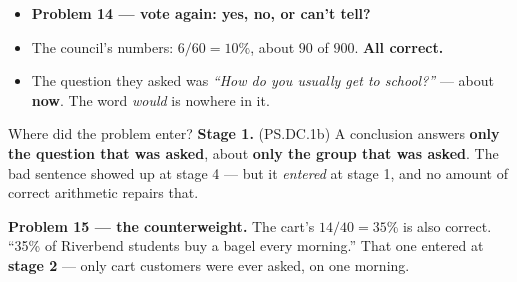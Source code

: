 \documentclass[aspectratio=169, 11pt]{beamer}
\newcommand{\redink}[1]{{\color{redacc}\bfseries #1}}
\begin{document}
\begin{frame}[t, plain]
  \vspace{4pt}
  \begin{itemize}\setlength{\itemsep}{4pt}
    \item \textbf{Problem 14 --- vote again: yes, no, or can't tell?}
    \item The council's numbers: $6/60 = 10\%$, about $90$ of $900$. \redink{All correct.}
    \item The question they asked was \emph{``How do you usually get to school?''} ---
          about \redink{now}. The word \emph{would} is nowhere in it.
  \end{itemize}
  \vspace{6pt}
  \begin{block}{Where did the problem enter? \redink{Stage 1.} (PS.DC.1b)}
    A conclusion answers \textbf{only the question that was asked}, about \textbf{only the
    group that was asked}. The bad sentence showed up at stage 4 --- but it \emph{entered} at
    stage 1, and no amount of correct arithmetic repairs that.
  \end{block}
  \vspace{4pt}
  {\small \textbf{Problem 15 --- the counterweight.} The cart's $14/40 = 35\%$ is also
  correct. ``35\% of Riverbend students buy a bagel every morning.'' That one entered at
  \redink{stage 2} --- only cart customers were ever asked, on one morning.}
\end{frame}
\end{document}
